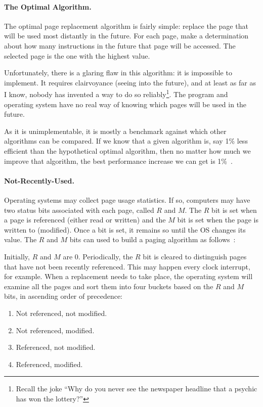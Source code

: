 \paragraph{The Optimal Algorithm.}
The optimal page replacement algorithm is fairly simple: replace the page that will be used most distantly in the future. For each page, make a determination about how many instructions in the future that page will be accessed. The selected page is the one with the highest value.

Unfortunately, there is a glaring flaw in this algorithm: it is impossible to implement. It requires clairvoyance (seeing into the future), and at least as far as I know, nobody has invented a way to do so reliably\footnote{Recall the joke ``Why do you never see the newspaper headline that a psychic has won the lottery?''}. The program and operating system have no real way of knowing which pages will be used in the future.

As it is unimplementable, it is mostly a benchmark against which other algorithms can be compared. If we know that a given algorithm is, say 1\% less efficient than the hypothetical optimal algorithm, then no matter how much we improve that algorithm, the best performance increase we can get is 1\%~\cite{mos}.

\paragraph{Not-Recently-Used.}
Operating systems may collect page usage statistics. If so, computers may have two status bits associated with each page, called $R$ and $M$. The $R$ bit is set when a page is referenced (either read or written) and the $M$ bit is set when the page is written to (modified). Once a bit is set, it remains so until the OS changes its value. The $R$ and $M$ bits can used to build a paging algorithm as follows~\cite{mos}:

Initially, $R$ and $M$ are 0. Periodically, the $R$ bit is cleared to distinguish pages that have not been recently referenced. This may happen every clock interrupt, for example. When a replacement needs to take place, the operating system will examine all the pages and sort them into four buckets based on the $R$ and $M$ bits, in ascending order of precedence:

\begin{enumerate}
	\item Not referenced, not modified.
	\item Not referenced, modified.
	\item Referenced, not modified.
	\item Referenced, modified.
\end{enumerate}

